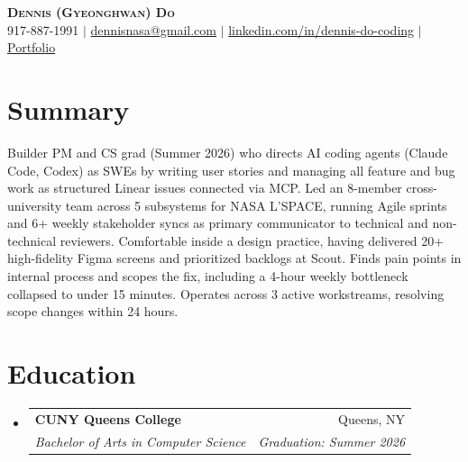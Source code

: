 \documentclass[letterpaper,10pt]{article}
\makeatletter
\newcommand{\resumeSubheading}[4]{
  \vspace{-2pt}\item
    \begin{tabular*}{0.97\textwidth}[t]{l@{\extracolsep{\fill}}r}
      \textbf{#1} & #2 \\
      \textit{\small#3} & \textit{\small #4} \\
    \end{tabular*}\vspace{-6pt}
}
\newcommand{\resumeSubHeadingListStart}{\begin{itemize}[leftmargin=0.15in, label={}]}
\newcommand{\resumeSubHeadingListEnd}{\end{itemize}}
\makeatother
\begin{document}
\begin{center}
    \textbf{\Huge \scshape Dennis (Gyeonghwan) Do} \\ \vspace{1pt}
    \small 917-887-1991 $|$ \href{mailto:dennisnasa@gmail.com}{dennisnasa@gmail.com} $|$
    \href{https://linkedin.com/in/dennis-do-coding}{linkedin.com/in/dennis-do-coding} $|$
    \href{https://personal-portfolio-bice-pi.vercel.app/}{Portfolio}
\end{center}

\section{Summary}
\vspace{1pt}
\small{Builder PM and CS grad (Summer 2026) who directs AI coding agents (Claude Code, Codex) as SWEs by writing user stories and managing all feature and bug work as structured Linear issues connected via MCP. Led an 8-member cross-university team across 5 subsystems for NASA L'SPACE, running Agile sprints and 6+ weekly stakeholder syncs as primary communicator to technical and non-technical reviewers. Comfortable inside a design practice, having delivered 20+ high-fidelity Figma screens and prioritized backlogs at Scout. Finds pain points in internal process and scopes the fix, including a 4-hour weekly bottleneck collapsed to under 15 minutes. Operates across 3 active workstreams, resolving scope changes within 24 hours.}
\vspace{-6pt}

\section{Education}
  \resumeSubHeadingListStart
    \resumeSubheading
      {CUNY Queens College}{Queens, NY}
      {Bachelor of Arts in Computer Science}{Graduation: Summer 2026}
  \resumeSubHeadingListEnd

\end{document}
